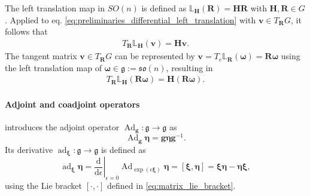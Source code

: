 The left translation map in $SO(n)$ is defined as $\mathbb{L}_{\bm{H}}(\bm{R}) = \bm{H}\bm{R}$ with $\bm{H},\bm{R} \in G$. Applied to eq. \eqref{eq:preliminaries_differential_left_translation} with $\bm{v} \in T_{\bm{R}}G$, it follows that
\begin{align*}
    T_{\bm{R}}\mathbb{L}_{\bm{H}}(\bm{v})= \bm{H}\bm{v}.
\end{align*}
The tangent matrix $\bm{v} \in T_{\bm{R}}G$ can be represented by $\bm{v} = T_{e}\mathbb{L}_{\bm{R}}(\bm{\omega}) = \bm{R}\bm{\omega}$ using the left translation map of $\bm{\omega} \in \mathfrak g := \mathfrak{so}(n)$, resulting in
\begin{align}\label{eq:preliminaries_differential_left_SO}
    T_{\bm{R}}\mathbb{L}_{\bm{H}}(\bm{R}\bm{\omega}) = \bm{H}(\bm{R}\bm{\omega}).
\end{align}





\paragraph{Adjoint and coadjoint operators}
\cite{Lee2008} introduces the adjoint operator $\operatorname{Ad}_{\bm{g}}: \mathfrak{g} \to \mathfrak{g}$ as
\begin{equation}
    \operatorname{Ad}_{\bm{g}}\bm{\eta}
    =
    \bm{g}\bm{\eta}\bm{g}^{-1}.
    \label{eq:adjoint_matrix}
\end{equation}
Its derivative  $\operatorname{ad}_{\bm{\xi}}: \mathfrak{g} \to \mathfrak{g}$ is defined as
\begin{equation}
    \operatorname{ad}_{\bm{\xi}}\bm{\eta}
    =
    \left.\frac{\mathrm{d}}{\mathrm{d}\epsilon}\right|_{\epsilon=0}
    \operatorname{Ad}_{\exp(\epsilon\bm{\xi})}\bm{\eta}
    =
    [\bm{\xi},\bm{\eta}]
    = \bm{\xi}\bm{\eta} - \bm{\eta}\bm{\xi},
    \label{eq:ad_lie_bracket}
\end{equation}
using the Lie bracket $[\cdot,\cdot]$ defined in \eqref{eq:matrix_lie_bracket}.

